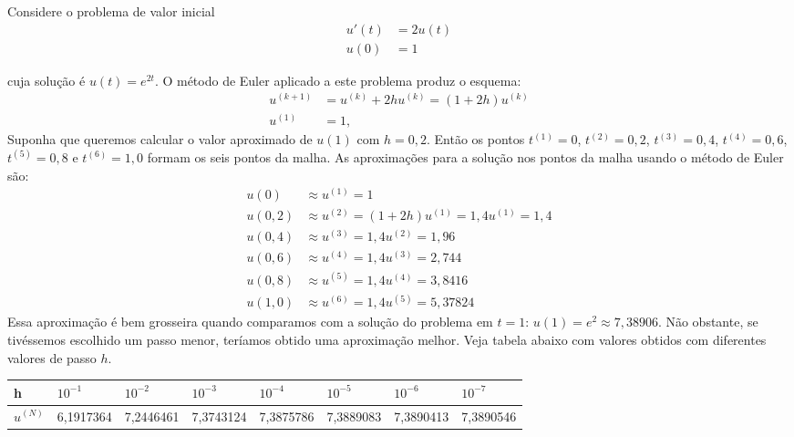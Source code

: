\begin{ex}
Considere o problema de valor inicial
\begin{equation}
 \begin{split}
  u'(t)&=2u(t)\\
  u(0)&=1
 \end{split}
\end{equation}

cuja solução é $u(t)=e^{2t}$. O método de Euler aplicado a este problema produz o  esquema:
\begin{equation}\label{eq:exemplo_y_2y_euler}
  \begin{split}
    u^{(k+1)}&= u^{(k)}+2hu^{(k)}=(1+2h)u^{(k)}\\
    u^{(1)}&= 1,
  \end{split}
\end{equation}
Suponha que queremos calcular o valor aproximado de $u(1)$ com $h=0,2$. Então os pontos $t^{(1)}=0$, $t^{(2)}=0,2$, $t^{(3)}=0,4$, $t^{(4)}=0,6$, $t^{(5)}=0,8$ e $t^{(6)}=1,0$ formam os seis pontos da malha. As aproximações para a solução nos pontos da malha usando o método de Euler são:
\begin{equation}
\begin{split}
  u(0)  &\approx u^{(1)}=1\\
  u(0,2)&\approx u^{(2)}=(1+2h) u^{(1)}=1,4 u^{(1)}=1,4\\
  u(0,4)&\approx u^{(3)}=1,4 u^{(2)}=1,96\\
  u(0,6)&\approx u^{(4)}=1,4 u^{(3)}=2,744\\
  u(0,8)&\approx u^{(5)}=1,4 u^{(4)}=3,8416\\
  u(1,0)&\approx u^{(6)}=1,4 u^{(5)}=5,37824
  \end{split}
\end{equation}
Essa aproximação é bem grosseira quando comparamos com a solução do problema em $t=1$: $u(1)=e^{2}\approx 7,38906$. Não obstante, se tivéssemos escolhido um passo menor, teríamos obtido uma aproximação melhor. Veja tabela abaixo com valores obtidos com diferentes valores de passo $h$.

\begin{tabular}{|l|l|l|l|l|l|l|l|}%
\hline
   h&$10^{-1}$&$10^{-2}$&$10^{-3}$&$10^{-4}$&$10^{-5}$&$10^{-6}$&$10^{-7}$\\
   \hline
   $u^{(N)}$& 6,1917364 & 7,2446461 & 7,3743124 & 7,3875786 & 7,3889083 & 7,3890413 & 7,3890546\\
   \hline
\end{tabular}


\end{ex}
